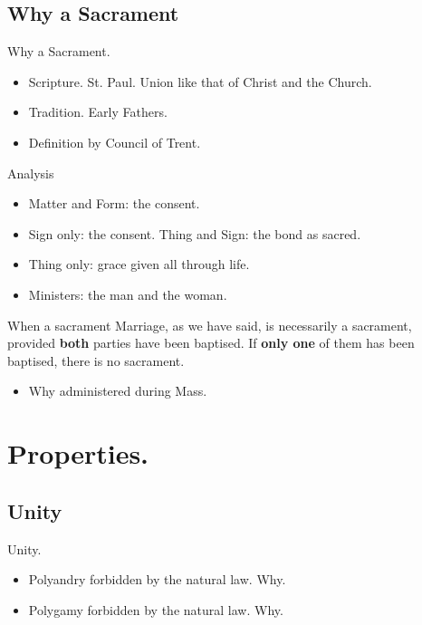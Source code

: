 \documentclass{beamer}
\begin{document}
\subsection{Why a Sacrament}

\begin{frame}{Why a Sacrament.}
\begin{itemize}
 \item   Scripture. St. Paul. Union like that of Christ and the Church.
 \item   Tradition. Early Fathers.
 \item   Definition by Council of Trent.
\end{itemize}
\end{frame}

\begin{frame}{Analysis}
\begin{itemize}
 \item   Matter and Form: the consent.
 \item   Sign only: the consent. Thing and Sign: the bond as sacred.
 \item   Thing only: grace given all through life.
 \item   Ministers: the man and the woman.
\end{itemize}
\end{frame}

\begin{frame}{When a sacrament}
Marriage, as we  have  said,  is  necessarily  a  sacrament,  provided  \textbf{both}
parties have been baptised. If \textbf{only one} of them has been baptised, there  is
no sacrament.

\begin{itemize}
 \item   Why administered during Mass.
\end{itemize}
\end{frame}

\section{Properties.}

\subsection{Unity}

\begin{frame}{Unity.}
\begin{itemize}
 \item   Polyandry forbidden by the natural law. Why.
 \item   Polygamy forbidden by the natural law. Why.
\end{itemize}
\end{frame}
\end{document}
